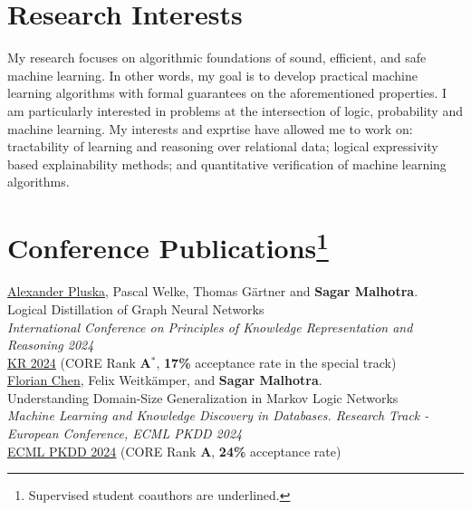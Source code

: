 \documentclass[10pt, a4paper]{article}
\newcommand{\years}[1]{\marginnote{\scriptsize #1}}
\begin{document}
\section*{Research Interests}
My research focuses on algorithmic foundations of sound, efficient, and safe machine learning. In other words, my goal is to develop practical machine learning algorithms with formal guarantees on the aforementioned properties. I am particularly interested in problems at the intersection of logic, probability and machine learning. My interests and exprtise have allowed me to work on: tractability of learning and reasoning over relational data; logical expressivity based explainability methods; and quantitative verification of machine learning algorithms. 






\section*{Conference Publications\protect\footnote{Supervised student coauthors are underlined.}}
\years{2024}\underline{Alexander Pluska}, Pascal Welke, Thomas G{\"a}rtner and \textbf{Sagar Malhotra}.\\
Logical Distillation of Graph Neural Networks\\
\emph{International Conference on Principles of Knowledge Representation and Reasoning 2024} \\
\href{https://arxiv.org/abs/2406.07126}{KR 2024} (CORE Rank \textbf{A$^{*}$}, \textbf{17\%} acceptance rate in the special track)\\

\newpage 
\years{2024}\underline{Florian Chen}, Felix Weitkämper, and \textbf{Sagar Malhotra}.\\
Understanding Domain-Size Generalization in Markov Logic Networks\\
\emph{Machine Learning and Knowledge Discovery in Databases. Research Track - European Conference, ECML PKDD 2024} \\
\href{https://arxiv.org/abs/2403.15933}{ECML PKDD 2024} (CORE Rank \textbf{A}, \textbf{24\%} acceptance rate)\\
\end{document}
